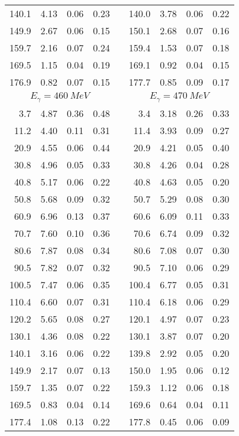 \begin{table}[htbp]
\begin{center}
\begin{tabular}{|r|r|c|c|l|r|r|c|c|}
140.1 &  4.13 &  0.06 &  0.23 & & 140.0 &  3.78 &  0.06 &  0.22 \\ 
149.9 &  2.67 &  0.06 &  0.15 & & 150.1 &  2.68 &  0.07 &  0.16 \\ 
159.7 &  2.16 &  0.07 &  0.24 & & 159.4 &  1.53 &  0.07 &  0.18 \\ 
169.5 &  1.15 &  0.04 &  0.19 & & 169.1 &  0.92 &  0.04 &  0.15 \\ 
176.9 &  0.82 &  0.07 &  0.15 & & 177.7 &  0.85 &  0.09 &  0.17 \\ 
\hline 
\hline 
\multicolumn{4}{|c|}{ $E_{\gamma}=460~MeV$} & & 
\multicolumn{4}{c|}{ $E_{\gamma}=470~MeV$} \\ 
\cline{1-4} 
\cline{6-9} 
  3.7 &  4.87 &  0.36 &  0.48 & &   3.4 &  3.18 &  0.26 &  0.33 \\ 
 11.2 &  4.40 &  0.11 &  0.31 & &  11.4 &  3.93 &  0.09 &  0.27 \\ 
 20.9 &  4.55 &  0.06 &  0.44 & &  20.9 &  4.21 &  0.05 &  0.40 \\ 
 30.8 &  4.96 &  0.05 &  0.33 & &  30.8 &  4.26 &  0.04 &  0.28 \\ 
 40.8 &  5.17 &  0.06 &  0.22 & &  40.8 &  4.63 &  0.05 &  0.20 \\ 
 50.8 &  5.68 &  0.09 &  0.32 & &  50.7 &  5.29 &  0.08 &  0.30 \\ 
 60.9 &  6.96 &  0.13 &  0.37 & &  60.6 &  6.09 &  0.11 &  0.33 \\ 
 70.7 &  7.60 &  0.10 &  0.36 & &  70.6 &  6.74 &  0.09 &  0.32 \\ 
 80.6 &  7.87 &  0.08 &  0.34 & &  80.6 &  7.08 &  0.07 &  0.30 \\ 
 90.5 &  7.82 &  0.07 &  0.32 & &  90.5 &  7.10 &  0.06 &  0.29 \\ 
100.5 &  7.47 &  0.06 &  0.35 & & 100.4 &  6.77 &  0.05 &  0.31 \\ 
110.4 &  6.60 &  0.07 &  0.31 & & 110.4 &  6.18 &  0.06 &  0.29 \\ 
120.2 &  5.65 &  0.08 &  0.27 & & 120.1 &  4.97 &  0.07 &  0.23 \\ 
130.1 &  4.36 &  0.08 &  0.22 & & 130.1 &  3.87 &  0.07 &  0.20 \\ 
140.1 &  3.16 &  0.06 &  0.22 & & 139.8 &  2.92 &  0.05 &  0.20 \\ 
149.9 &  2.17 &  0.07 &  0.13 & & 150.0 &  1.95 &  0.06 &  0.12 \\ 
159.7 &  1.35 &  0.07 &  0.22 & & 159.3 &  1.12 &  0.06 &  0.18 \\ 
169.5 &  0.83 &  0.04 &  0.14 & & 169.6 &  0.64 &  0.04 &  0.11 \\ 
177.4 &  1.08 &  0.13 &  0.22 & & 177.8 &  0.45 &  0.06 &  0.09 \\ 
\cline{1-4} 
\cline{6-9} 
\end{tabular} 

\end{center} 
\end{table}
